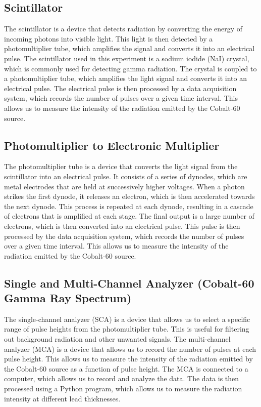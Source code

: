 \documentclass[12pt]{article}
\begin{document}
        \subsection{Scintillator}
            The scintillator is a device that detects radiation by converting the energy of incoming photons into visible light. 
            This light is then detected by a photomultiplier tube, which amplifies the signal and converts it into an electrical pulse. 
            The scintillator used in this experiment is a sodium iodide (NaI) crystal, which is commonly used for detecting gamma radiation. 
            The crystal is coupled to a photomultiplier tube, which amplifies the light signal and converts it into an electrical pulse. 
            The electrical pulse is then processed by a data acquisition system, which records the number of pulses over a given time interval. 
            This allows us to measure the intensity of the radiation emitted by the Cobalt-60 source.

        \subsection{Photomultiplier to Electronic Multiplier}
            The photomultiplier tube is a device that converts the light signal from the scintillator into an electrical pulse. 
            It consists of a series of dynodes, which are metal electrodes that are held at successively higher voltages. 
            When a photon strikes the first dynode, it releases an electron, which is then accelerated towards the next dynode. 
            This process is repeated at each dynode, resulting in a cascade of electrons that is amplified at each stage. 
            The final output is a large number of electrons, which is then converted into an electrical pulse. 
            This pulse is then processed by the data acquisition system, which records the number of pulses over a given time interval. 
            This allows us to measure the intensity of the radiation emitted by the Cobalt-60 source.
            
        \subsection{Single and Multi-Channel Analyzer (Cobalt-60 Gamma Ray Spectrum)}
            The single-channel analyzer (SCA) is a device that allows us to select a specific range of pulse heights from the photomultiplier tube. 
            This is useful for filtering out background radiation and other unwanted signals. 
            The multi-channel analyzer (MCA) is a device that allows us to record the number of pulses at each pulse height. 
            This allows us to measure the intensity of the radiation emitted by the Cobalt-60 source as a function of pulse height. 
            The MCA is connected to a computer, which allows us to record and analyze the data. 
            The data is then processed using a Python program, which allows us to measure the radiation intensity at different lead thicknesses.
            
\end{document}

